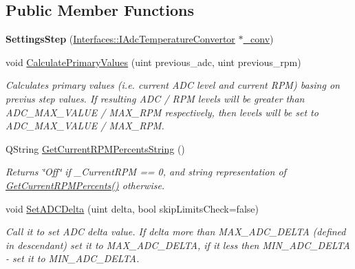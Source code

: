 \subsection*{Public Member Functions}
\begin{DoxyCompactItemize}
\item 
\mbox{\label{class_settings_step_a5239f429f2c4abe89ddd16bedb77fce9}} 
{\bfseries Settings\+Step} (\hyperlink{class_interfaces_1_1_i_adc_temperature_convertor}{Interfaces\+::\+I\+Adc\+Temperature\+Convertor} $\ast$\hyperlink{class_interfaces_1_1_i_settings_step_aaa28fcd5fc0d1ed075ad2e274dd5ca01}{\+\_\+conv})
\item 
void \hyperlink{class_settings_step_ac6f79a139ab25cc50ed105f64fc9652f}{Calculate\+Primary\+Values} (uint previous\+\_\+adc, uint previous\+\_\+rpm)
\begin{DoxyCompactList}\small\item\em Calculates primary values (i.\+e. current A\+DC level and current R\+PM) basing on previus step values. If resulting A\+DC / R\+PM levels will be greater than A\+D\+C\+\_\+\+M\+A\+X\+\_\+\+V\+A\+L\+UE / M\+A\+X\+\_\+\+R\+PM respectively, then levels will be set to A\+D\+C\+\_\+\+M\+A\+X\+\_\+\+V\+A\+L\+UE / M\+A\+X\+\_\+\+R\+PM. \end{DoxyCompactList}\item 
Q\+String \hyperlink{class_settings_step_a21e452401e180d6e114561a8b05ab1ae}{Get\+Current\+R\+P\+M\+Percents\+String} ()
\begin{DoxyCompactList}\small\item\em Returns \char`\"{}\+Off\char`\"{} if \+\_\+\+Current\+R\+PM == 0, and string representation of \hyperlink{class_settings_step_a35bea9115637a0c848e8f827f2353c11}{Get\+Current\+R\+P\+M\+Percents()} otherwise. \end{DoxyCompactList}\item 
void \hyperlink{class_settings_step_a8124c87ae0b1d9fb3b623144d0e492db}{Set\+A\+D\+C\+Delta} (uint delta, bool skip\+Limits\+Check=false)
\begin{DoxyCompactList}\small\item\em Call it to set A\+DC delta value. If delta more than M\+A\+X\+\_\+\+A\+D\+C\+\_\+\+D\+E\+L\+TA (defined in descendant) set it to M\+A\+X\+\_\+\+A\+D\+C\+\_\+\+D\+E\+L\+TA, if it less then M\+I\+N\+\_\+\+A\+D\+C\+\_\+\+D\+E\+L\+TA -\/ set it to M\+I\+N\+\_\+\+A\+D\+C\+\_\+\+D\+E\+L\+TA. \end{DoxyCompactList}\item 

\end{DoxyCompactItemize}
